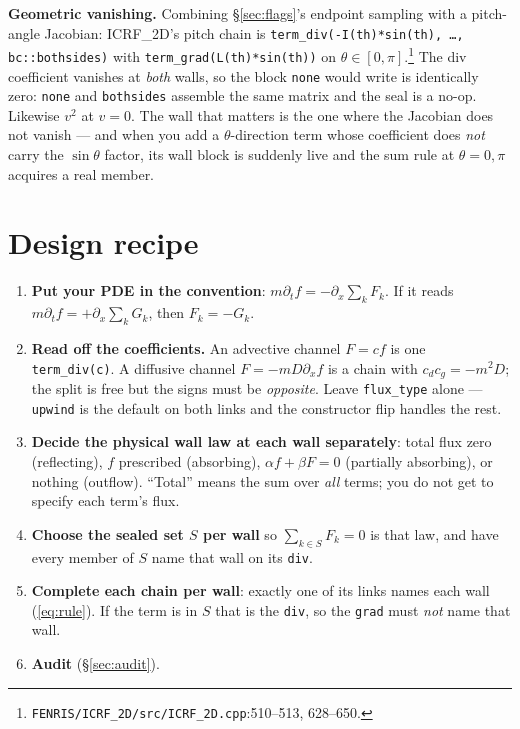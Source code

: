 \documentclass[10pt]{article}
\newcommand{\code}[1]{\texttt{#1}}
\begin{document}
\textbf{Geometric vanishing.} Combining \S\ref{sec:flags}'s endpoint sampling
with a pitch-angle Jacobian: ICRF\_2D's pitch chain is
\code{term\_div(-I(th)*sin(th), \dots, bc::bothsides)} with
\code{term\_grad(L(th)*sin(th))} on
$\theta\in[0,\pi]$.\footnote{\code{FENRIS/ICRF\_2D/src/ICRF\_2D.cpp}:510--513,
628--650.} The div coefficient vanishes at \emph{both} walls, so the block
\code{none} would write is identically zero: \code{none} and \code{bothsides}
assemble the same matrix and the seal is a no-op. Likewise $v^2$ at $v=0$. The
wall that matters is the one where the Jacobian does not vanish --- and when you
add a $\theta$-direction term whose coefficient does \emph{not} carry the
$\sin\theta$ factor, its wall block is suddenly live and the sum rule at
$\theta=0,\pi$ acquires a real member.

\section{Design recipe}
\label{sec:recipe}

\begin{enumerate}\itemsep0pt
\item \textbf{Put your PDE in the convention}: $m\partial_tf=-\partial_x\sum_kF_k$.
If it reads $m\partial_tf=+\partial_x\sum_kG_k$, then $F_k=-G_k$.
\item \textbf{Read off the coefficients.} An advective channel $F=cf$ is one
\code{term\_div(c)}. A diffusive channel $F=-mD\partial_xf$ is a chain with
$c_dc_g=-m^2D$; the split is free but the signs must be \emph{opposite}. Leave
\code{flux\_type} alone --- \code{upwind} is the default on both links and the
constructor flip handles the rest.
\item \textbf{Decide the physical wall law at each wall separately}: total flux
zero (reflecting), $f$ prescribed (absorbing), $\alpha f+\beta F=0$ (partially
absorbing), or nothing (outflow). ``Total'' means the sum over \emph{all} terms;
you do not get to specify each term's flux.
\item \textbf{Choose the sealed set $S$ per wall} so $\sum_{k\in S}F_k=0$ is that
law, and have every member of $S$ name that wall on its \code{div}.
\item \textbf{Complete each chain per wall}: exactly one of its links names each
wall (\eqref{eq:rule}). If the term is in $S$ that is the \code{div}, so the
\code{grad} must \emph{not} name that wall.
\item \textbf{Audit} (\S\ref{sec:audit}).
\end{enumerate}
\end{document}
